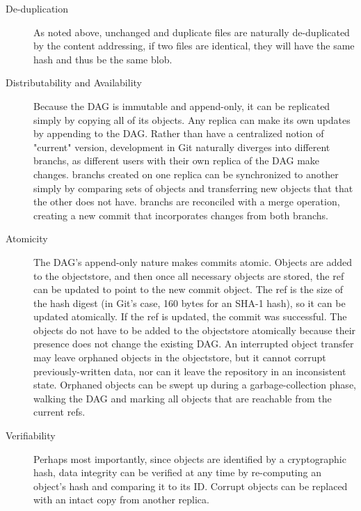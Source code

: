 \begin{description}

    \item[De-duplication] As noted above, unchanged and duplicate files are
        naturally de-duplicated by the content addressing, if two files are
        identical, they will have the same hash and thus be the same \gls{blob}.

    \item[Distributability and Availability] Because the \gls{DAG} is immutable
        and append-only, it can be replicated simply by copying all of its
        objects. Any replica can make its own updates by appending to the
        \gls{DAG}. Rather than have a centralized notion of "current" version,
        development in Git naturally diverges into different \glspl{branch}, as
        different users with their own replica of the \gls{DAG} make changes.
        \Glspl{branch} created on one replica can be synchronized to another
        simply by comparing sets of objects and transferring new objects that
        that the other does not have. \Glspl{branch} are reconciled with a
        \gls{merge} operation, creating a new \gls{commit} that incorporates
        changes from both \glspl{branch}.

    \item[Atomicity] The \gls{DAG}'s append-only nature makes \glspl{commit}
        atomic. Objects are added to the \gls{objectstore}, and then once all
        necessary objects are stored, the \gls{ref} can be updated to point to
        the new \gls{commit} object. The \gls{ref} is the size of the hash
        digest (in Git's case, \num{160} bytes for an SHA-1 hash), so it can be
        updated atomically. If the \gls{ref} is updated, the \gls{commit} was
        successful. The objects do not have to be added to the \gls{objectstore}
        atomically because their presence does not change the existing
        \gls{DAG}. An interrupted object transfer may leave orphaned objects in
        the \gls{objectstore}, but it cannot corrupt previously-written data,
        nor can it leave the \gls{repository} in an inconsistent state. Orphaned
        objects can be swept up during a garbage-collection phase, walking the
        \gls{DAG} and marking all objects that are reachable from the current
        \glspl{ref}.

    \item[Verifiability] Perhaps most importantly, since objects are identified
        by a cryptographic hash, data integrity can be verified at any time by
        re-computing an object's hash and comparing it to its ID. Corrupt
        objects can be replaced with an intact copy from another replica.

\end{description}

